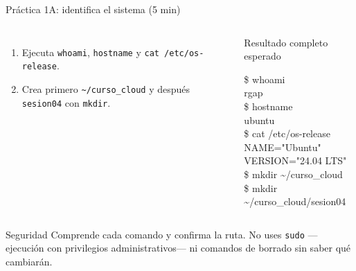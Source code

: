 \documentclass[aspectratio=169,10pt,c]{beamer}
\begin{document}
\begin{frame}{Práctica 1A: identifica el sistema \textnormal{\small(5 min)}}
\begin{columns}[T,onlytextwidth]
\begin{enumerate}\setlength\itemsep{4pt}\small
  \item Ejecuta \texttt{whoami}, \texttt{hostname} y \texttt{cat /etc/os-release}.
  \item Crea primero \texttt{\textasciitilde/curso\_cloud} y después \texttt{sesion04} con \texttt{mkdir}.
\end{enumerate}
\begin{exampleblock}{Resultado completo esperado}
\begin{terminal}
\$ whoami\\
rgap\\
\$ hostname\\
ubuntu\\
\$ cat /etc/os-release\\
NAME="Ubuntu"\\
VERSION="24.04 LTS"\\
\$ mkdir \textasciitilde/curso\_cloud\\
\$ mkdir \textasciitilde/curso\_cloud/sesion04
\end{terminal}
\end{exampleblock}
\end{columns}
\begin{alertblock}{Seguridad}
\small Comprende cada comando y confirma la ruta. No uses \texttt{sudo} —ejecución con privilegios administrativos— ni comandos de borrado sin saber qué cambiarán.
\end{alertblock}
\end{frame}
\end{document}
